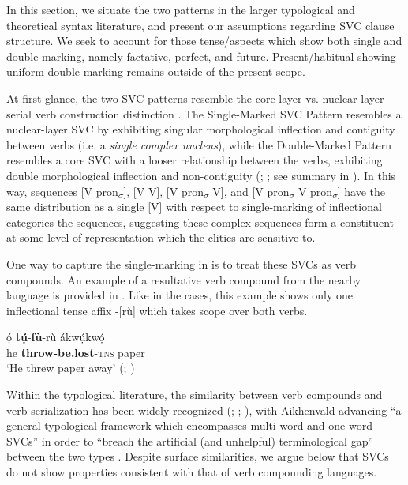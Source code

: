 \documentclass[output=paper]{langsci/langscibook}
\begin{document}
In this section, we situate the two  patterns in the larger typological and theoretical syntax literature, and present our assumptions regarding  SVC clause structure. We seek to account for those tense/aspects which show both single and double-marking, namely factative, perfect, and future. Present/ha\-bit\-u\-al showing uniform double-marking remains outside of the present scope. 

At first glance, the two  SVC patterns resemble the core-layer vs. nu\-cle\-ar-layer serial verb construction distinction \citep{FoleyOlson1985}. The Single-Marked SVC Pattern resembles a nuclear-layer SVC by exhibiting singular morphological inflection and contiguity between verbs (i.e. a \textit{single complex nucleus}), while the Double-Marked Pattern resembles a core SVC with a looser relationship between the verbs, exhibiting double morphological inflection and non-contiguity (\citealt[37--39]{FoleyOlson1985}; \citealt{Crowley2002}; see summary in \citealt[126-129]{ClearyKemp2015}). In this way, sequences [V pron\textsubscript{$\sigma $}], [V V], [V pron\textsubscript{$\sigma $} V], and [V pron\textsubscript{$\sigma $} V pron\textsubscript{$\sigma $}] have the same distribution as a single [V] with respect to single-marking of inflectional categories the sequences, suggesting these complex sequences form a constituent at some level of representation which the clitics are sensitive to. 

One way to capture the single-marking in  is to treat these SVCs as verb compounds. An example of a resultative verb compound from the nearby language  is provided in . Like in the  cases, this example shows only one inflectional tense affix -[rù] which takes scope over both verbs.

\ea\label{ex:rolle:34}
\gll  ọ́    \textbf{{\downstep}tụ́}{}-\textbf{fù}{}-rù      ákwụ́kwọ́\\
     he  \textbf{throw-be.lost}{}-\textsc{tns}  paper\\
\glt ‘He threw paper away’ (; \citealt{Lord1975})
\z

Within the typological literature, the similarity between verb compounds and verb serialization has been widely recognized (\citealt[101]{Margetts1999}; \citealt[18]{Crowley2002}; \citealt[a.o.]{Aikhenvald2006}), with Aikhenvald advancing “a general typological framework which encompasses multi-word and one-word SVCs” in order to “breach the artificial (and unhelpful) terminological gap” between the two types \citep[38]{Aikhenvald2006}. Despite surface similarities, we argue below that  SVCs do not show properties consistent with that of verb compounding languages.  
 
\end{document}
